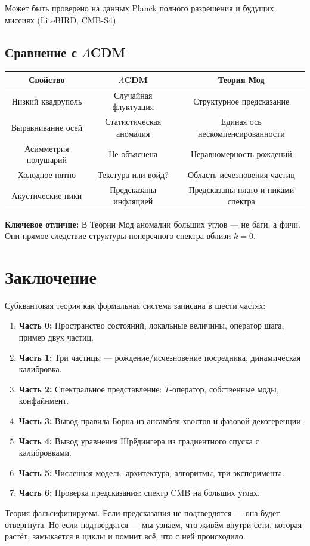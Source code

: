 \documentclass[11pt,a4paper]{article}
\theoremstyle{definition}
\begin{document}
Может быть проверено на данных Planck полного разрешения и будущих миссиях (LiteBIRD, CMB-S4).

\subsection{Сравнение с $\Lambda$CDM}

\begin{center}
\begin{tabular}{c|c|c}
\textbf{Свойство} & \textbf{$\Lambda$CDM} & \textbf{Теория Мод} \\
\hline
Низкий квадруполь & Случайная флуктуация & Структурное предсказание \\
Выравнивание осей & Статистическая аномалия & Единая ось нескомпенсированности \\
Асимметрия полушарий & Не объяснена & Неравномерность рождений \\
Холодное пятно & Текстура или войд? & Область исчезновения частиц \\
Акустические пики & Предсказаны инфляцией & Предсказаны плато и пиками спектра
\end{tabular}
\end{center}

\textbf{Ключевое отличие:} В Теории Мод аномалии больших углов --- не баги, а фичи. Они прямое следствие структуры поперечного спектра вблизи $k = 0$.

\newpage
\section*{Заключение}

Субквантовая теория как формальная система записана в шести частях:

\begin{enumerate}
    \item \textbf{Часть 0:} Пространство состояний, локальные величины, оператор шага, пример двух частиц.
    \item \textbf{Часть 1:} Три частицы --- рождение/исчезновение посредника, динамическая калибровка.
    \item \textbf{Часть 2:} Спектральное представление: $T$-оператор, собственные моды, конфайнмент.
    \item \textbf{Часть 3:} Вывод правила Борна из ансамбля хвостов и фазовой декогеренции.
    \item \textbf{Часть 4:} Вывод уравнения Шрёдингера из градиентного спуска с калибровками.
    \item \textbf{Часть 5:} Численная модель: архитектура, алгоритмы, три эксперимента.
    \item \textbf{Часть 6:} Проверка предсказания: спектр CMB на больших углах.
\end{enumerate}

Теория фальсифицируема. Если предсказания не подтвердятся --- она будет отвергнута. Но если подтвердятся --- мы узнаем, что живём внутри сети, которая растёт, замыкается в циклы и помнит всё, что с ней происходило.
\end{document}
